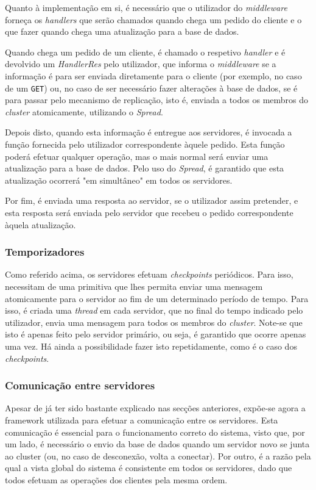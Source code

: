 \documentclass[a4paper]{report}
\begin{document}
{				Quanto à implementação em si, é necessário que o utilizador do \textit{middleware} forneça os \textit{handlers} que serão chamados quando chega um pedido do cliente e o que fazer quando chega uma atualização para a base de dados. 
				
				Quando chega um pedido de um cliente, é chamado o respetivo \textit{handler} e é devolvido um \textit{HandlerRes} pelo utilizador, que informa o \textit{middleware} se a informação é para ser enviada diretamente para o cliente (por exemplo, no caso de um \texttt{GET}) ou, no caso de ser necessário fazer alterações à base de dados, se é para passar pelo mecanismo de replicação, isto é, enviada a todos os membros do \textit{cluster} atomicamente, utilizando o \textit{Spread}.
				
				Depois disto, quando esta informação é entregue aos servidores, é invocada a função fornecida pelo utilizador correspondente àquele pedido. Esta função poderá efetuar qualquer operação, mas o mais normal será enviar uma atualização para a base de dados. Pelo uso do \textit{Spread}, é garantido que esta atualização ocorrerá "em simultâneo" em todos os servidores.
				
				Por fim, é enviada uma resposta ao servidor, se o utilizador assim pretender, e esta resposta será enviada pelo servidor que recebeu o pedido correspondente àquela atualização.

			\subsubsection{Temporizadores} \label{sssec:Timers}
				Como referido acima, os servidores efetuam \textit{checkpoints} periódicos. Para isso, necessitam de uma primitiva que lhes permita enviar uma mensagem atomicamente para o servidor ao fim de um determinado período de tempo. Para isso, é criada uma \textit{thread} em cada servidor, que no final do tempo indicado pelo utilizador, envia uma mensagem para todos os membros do \textit{cluster}. Note-se que isto é apenas feito pelo servidor primário, ou seja, é garantido que ocorre apenas uma vez. Há ainda a possibilidade fazer isto repetidamente, como é o caso dos \textit{checkpoints}.

			\subsubsection{Comunicação entre servidores} \label{sssec:ServerCommunication}
				Apesar de já ter sido bastante explicado nas secções anteriores, expõe-se agora a framework utilizada para efetuar a comunicação entre os servidores. Esta comunicação é essencial para o funcionamento correto do sistema, visto que, por um lado, é necessário o envio da base de dados quando um servidor novo se junta ao cluster (ou, no caso de desconexão, volta a conectar). Por outro, é a razão pela qual a vista global do sistema é consistente em todos os servidores, dado que todos efetuam as operações dos clientes pela mesma ordem.
				
}
\end{document}
